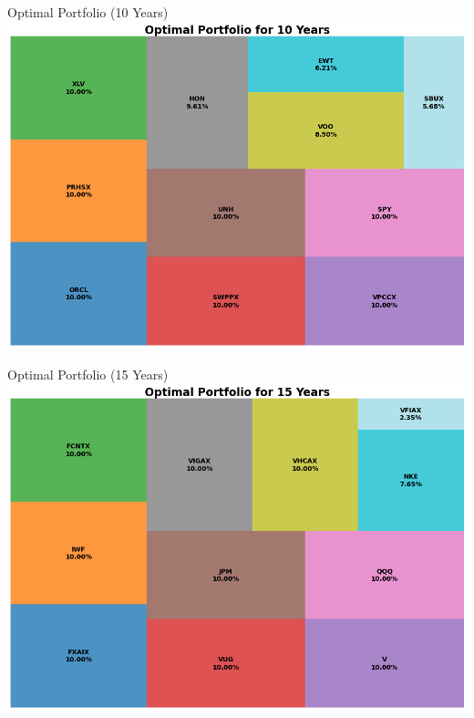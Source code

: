 \documentclass{beamer}
\begin{document}
\begin{frame}{Optimal Portfolio (10 Years)}
    \centering
    \includegraphics[height=0.8\textheight]{optimal_portfolio_10_years.png}
\end{frame}

\begin{frame}{Optimal Portfolio (15 Years)}
    \centering
    \includegraphics[height=0.8\textheight]{optimal_portfolio_15_years.png}
\end{frame}
\end{document}
